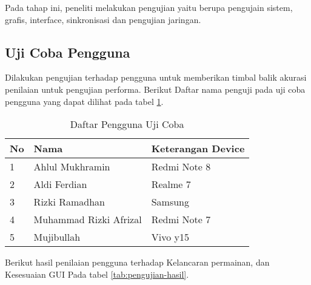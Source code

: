 Pada tahap ini, peneliti melakukan pengujian yaitu berupa pengujain sistem, grafis, interface, sinkronisasi dan pengujian jaringan.

\subsection{Uji Coba Pengguna}
\noindent

Dilakukan pengujian terhadap pengguna untuk 
memberikan timbal balik akurasi penilaian untuk pengujian 
performa. Berikut Daftar nama penguji pada uji coba pengguna 
yang dapat dilihat pada tabel \ref{tab:pengguna-uji}.
\newpage

\begin{table}[h]
    \centering
    \caption{Daftar Pengguna Uji Coba}
    \label{tab:pengguna-uji}
    \begin{tabular}{|l|l|l|}
    \hline
    \textbf{No} & \textbf{Nama}          & \textbf{Keterangan Device} \\ \hline
    1           & Ahlul Mukhramin        & Redmi Note 8               \\ \hline
    2           & Aldi Ferdian           & Realme 7                   \\ \hline
    3           & Rizki Ramadhan         & Samsung                    \\ \hline
    4           & Muhammad Rizki Afrizal & Redmi Note 7               \\ \hline
    5           & Mujibullah             & Vivo y15                   \\ \hline
    \end{tabular}
    \end{table}

Berikut hasil penilaian pengguna terhadap Kelancaran permainan, dan Kesesuaian GUI Pada tabel \ref{tab:pengujian-hasil}.

